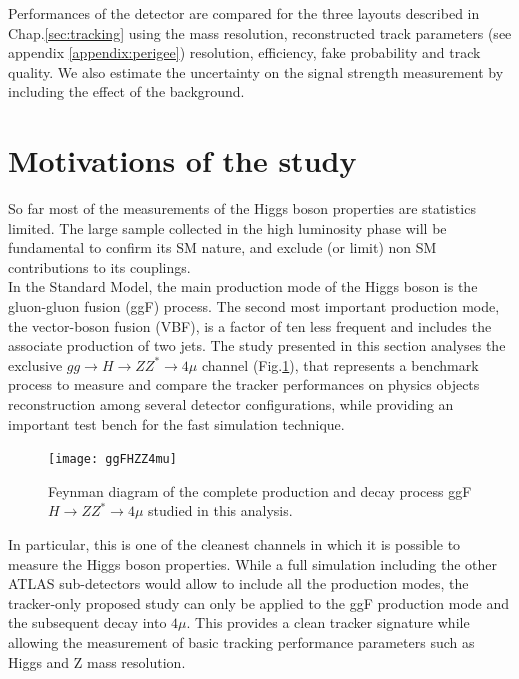 \documentclass[a4paper,twoside,12pt]{book}
\begin{document}
Performances of the detector are compared for the three layouts described in Chap.\ref{sec:tracking} 
using the mass resolution, reconstructed track parameters (see appendix \ref{appendix:perigee}) resolution, efficiency, fake probability
and track quality. We also estimate the uncertainty on the signal strength measurement by including the effect of the background.\\

\section{Motivations of the study}
So far most of the measurements of the Higgs boson properties are statistics limited. The large sample collected in the high luminosity phase will be
fundamental to confirm its SM nature, and exclude (or limit) non SM contributions to its couplings. \\

In the Standard Model, the main 
production mode of the Higgs boson is the gluon-gluon fusion (ggF) process. The second most 
important production mode, the vector-boson fusion (VBF), is a factor of ten less frequent and includes the associate
production of two jets. The study presented in this section analyses the exclusive
$gg \rightarrow H \rightarrow ZZ^* \rightarrow 4\mu$ channel (Fig.\ref{fig:ggFHZZ4mu}), that represents a benchmark process to measure and compare the tracker performances on physics objects reconstruction among several detector
configurations, while providing an important test bench for the fast simulation technique.\\

\begin{figure} [h]
	\centering
	\texttt{[image: ggFHZZ4mu]}
	\caption{Feynman diagram of the complete production and decay process 
	ggF $H \rightarrow ZZ^* \rightarrow 4\mu$ studied in 
	this analysis.}
	\label{fig:ggFHZZ4mu}
\end{figure}

In particular, this is one of the cleanest channels in which it is possible to measure the Higgs boson properties. While a full 
simulation including the other ATLAS sub-detectors would allow to include all the
production modes, the tracker-only proposed study can only
be applied to the ggF production mode and the subsequent decay into $4\mu$. This provides a clean tracker signature while
allowing the measurement of basic tracking performance parameters such as Higgs and Z mass resolution.
\end{document}
